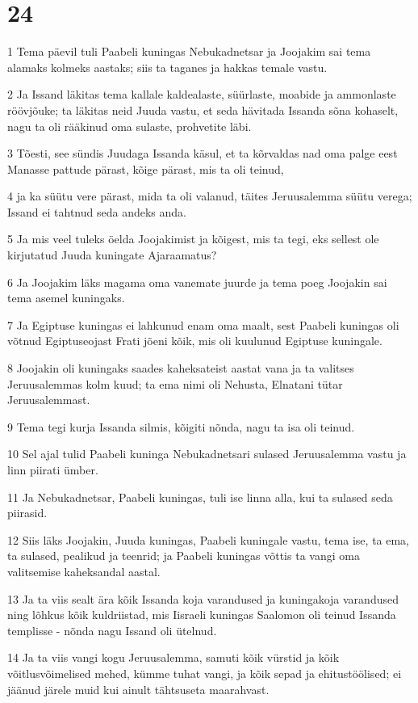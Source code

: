 \chapter{24}

\par 1 Tema päevil tuli Paabeli kuningas Nebukadnetsar ja Joojakim sai tema alamaks kolmeks aastaks; siis ta taganes ja hakkas temale vastu.
\par 2 Ja Issand läkitas tema kallale kaldealaste, süürlaste, moabide ja ammonlaste röövjõuke; ta läkitas neid Juuda vastu, et seda hävitada Issanda sõna kohaselt, nagu ta oli rääkinud oma sulaste, prohvetite läbi.
\par 3 Tõesti, see sündis Juudaga Issanda käsul, et ta kõrvaldas nad oma palge eest Manasse pattude pärast, kõige pärast, mis ta oli teinud,
\par 4 ja ka süütu vere pärast, mida ta oli valanud, täites Jeruusalemma süütu verega; Issand ei tahtnud seda andeks anda.
\par 5 Ja mis veel tuleks öelda Joojakimist ja kõigest, mis ta tegi, eks sellest ole kirjutatud Juuda kuningate Ajaraamatus?
\par 6 Ja Joojakim läks magama oma vanemate juurde ja tema poeg Joojakin sai tema asemel kuningaks.
\par 7 Ja Egiptuse kuningas ei lahkunud enam oma maalt, sest Paabeli kuningas oli võtnud Egiptuseojast Frati jõeni kõik, mis oli kuulunud Egiptuse kuningale.
\par 8 Joojakin oli kuningaks saades kaheksateist aastat vana ja ta valitses Jeruusalemmas kolm kuud; ta ema nimi oli Nehusta, Elnatani tütar Jeruusalemmast.
\par 9 Tema tegi kurja Issanda silmis, kõigiti nõnda, nagu ta isa oli teinud.
\par 10 Sel ajal tulid Paabeli kuninga Nebukadnetsari sulased Jeruusalemma vastu ja linn piirati ümber.
\par 11 Ja Nebukadnetsar, Paabeli kuningas, tuli ise linna alla, kui ta sulased seda piirasid.
\par 12 Siis läks Joojakin, Juuda kuningas, Paabeli kuningale vastu, tema ise, ta ema, ta sulased, pealikud ja teenrid; ja Paabeli kuningas võttis ta vangi oma valitsemise kaheksandal aastal.
\par 13 Ja ta viis sealt ära kõik Issanda koja varandused ja kuningakoja varandused ning lõhkus kõik kuldriistad, mis Iisraeli kuningas Saalomon oli teinud Issanda templisse - nõnda nagu Issand oli ütelnud.
\par 14 Ja ta viis vangi kogu Jeruusalemma, samuti kõik vürstid ja kõik võitlusvõimelised mehed, kümme tuhat vangi, ja kõik sepad ja ehitustöölised; ei jäänud järele muid kui ainult tähtsuseta maarahvast.

